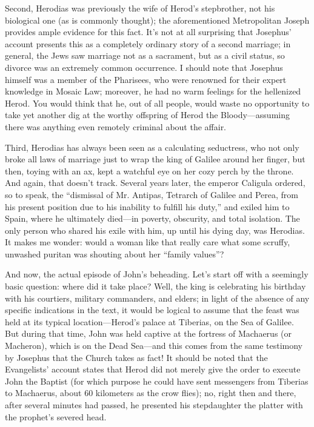 Second, Herodias was previously the wife of Herod's stepbrother, not his biological one (as is commonly thought); the aforementioned Metropolitan Joseph provides ample evidence for this fact. It's not at all surprising that Josephus' account presents this as a completely ordinary story of a second marriage; in general, the Jews saw marriage not as a sacrament, but as a civil status, so divorce was an extremely common occurrence. I should note that Josephus himself was a member of the Pharisees, who were renowned for their expert knowledge in Mosaic Law; moreover, he had no warm feelings for the hellenized Herod. You would think that he, out of all people, would waste no opportunity to take yet another dig at the worthy offspring of Herod the Bloody---assuming there was anything even remotely criminal about the affair.

Third, Herodias has always been seen as a calculating seductress, who not only broke all laws of marriage just to wrap the king of Galilee around her finger, but then, toying with an ax, kept a watchful eye on her cozy perch by the throne. And again, that doesn't track. Several years later, the emperor Caligula ordered, so to speak, the ``dismissal of Mr. Antipas, Tetrarch of Galilee and Perea, from his present position due to his inability to fulfill his duty,'' and exiled him to Spain, where he ultimately died---in poverty, obscurity, and total isolation. The only person who shared his exile with him, up until his dying day, was Herodias. It makes me wonder: would a woman like that really care what some scruffy, unwashed puritan was shouting about her ``family values''?

And now, the actual episode of John's beheading. Let's start off with a seemingly basic question: where did it take place? Well, the king is celebrating his birthday with his courtiers, military commanders, and elders; in light of the absence of any specific indications in the text, it would be logical to assume that the feast was held at its typical location---Herod's palace at Tiberias, on the Sea of Galilee. But during that time, John was held captive at the fortress of Machaerus (or Macheron), which is on the Dead Sea---and this comes from the same testimony by Josephus that the Church takes as fact! It should be noted that the Evangelists' account states that Herod did not merely give the order to execute John the Baptist (for which purpose he could have sent messengers from Tiberias to Machaerus, about 60 kilometers as the crow flies); no, right then and there, after several minutes had passed, he presented his stepdaughter the platter with the prophet's severed head.

